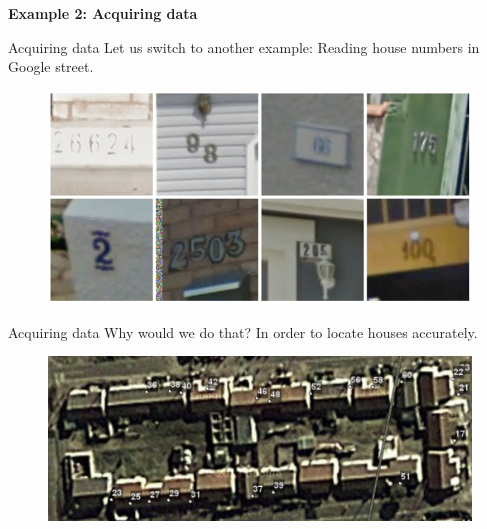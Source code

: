 \documentclass{beamer}
\begin{document}
\begin{frame}
\center
\Huge
\textbf{Example 2: Acquiring data}
\end{frame}

\begin{frame}{Acquiring data}
Let us switch to another example: \pause Reading house numbers in Google street.
\pause
\vfill
\begin{figure}
\centering
\includegraphics[width=\textwidth]{images/street_numbers.png}
\end{figure}
\end{frame}

\begin{frame}{Acquiring data}
Why would we do that? \pause In order to locate houses accurately.
\vfill
\pause
\begin{figure}
\centering
\includegraphics[width=\textwidth]{images/house_numbers.png}
\end{figure}
\end{frame}
\end{document}
